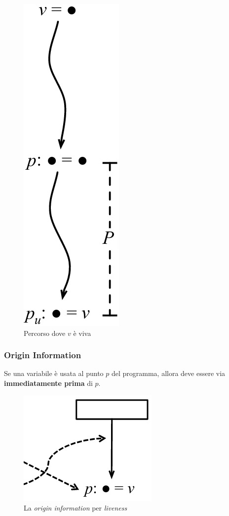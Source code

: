 \begin{figure}[H]
  \centering
  \includegraphics[scale=0.4]{res/image/liveness_v}
  \caption{Percorso dove $v$ \`e viva}
  \label{img:liveness_v}
\end{figure}

\subsubsection{Origin Information}
Se una variabile \`e usata al punto $p$ del programma, allora deve essere via
\textbf{immediatamente prima} di $p$.

\begin{figure}[H]
  \centering
  \includegraphics[scale=0.4]{res/image/origin_liveness}
  \caption{La \textit{origin information} per \textit{liveness}}
  \label{img:origin_liveness}
\end{figure}

